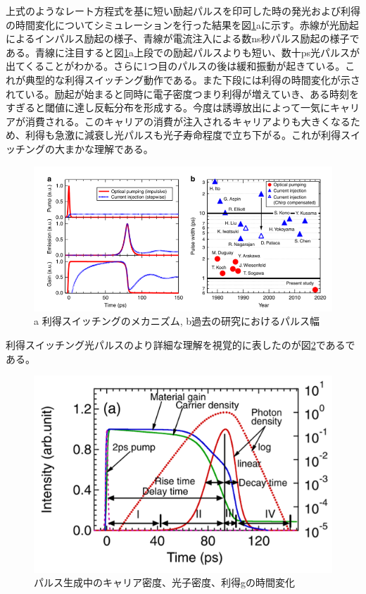上式のようなレート方程式を基に短い励起パルスを印可した時の発光および利得の時間変化についてシミュレーションを行った結果を図\ref{fig:fig_1_1_GS_ito}aに示す。赤線が光励起によるインパルス励起の様子、青線が電流注入による数ns秒パルス励起の様子である。青線に注目すると図\ref{fig:fig_1_1_GS_ito}a上段での励起パルスよりも短い、数十ps光パルスが出てくることがわかる。さらに1つ目のパルスの後は緩和振動が起きている。これが典型的な利得スイッチング動作である。また下段には利得の時間変化が示されている。励起が始まると同時に電子密度つまり利得が増えていき、ある時刻をすぎると閾値に達し反転分布を形成する。今度は誘導放出によって一気にキャリアが消費される。このキャリアの消費が注入されるキャリアよりも大きくなるため、利得も急激に減衰し光パルスも光子寿命程度で立ち下がる。これが利得スイッチングの大まかな理解である。

\begin{figure}[h]
	\centering
	\includegraphics[width=15cm]{figure/fig_1_1_GS_ito.png}
	\caption{a 利得スイッチングのメカニズム, b過去の研究におけるパルス幅\cite{ref_t_ito}}
	\label{fig:fig_1_1_GS_ito}
\end{figure}

\newpage
利得スイッチング光パルスのより詳細な理解を視覚的に表したのが図\ref{fig:fig_1_1_GS_pulse}である\cite{ref_1_1_GS}である。
\begin{figure}[h]
	\centering
	\includegraphics[width=15cm]{figure/fig_1_1_GS_pulse.png}
	\caption{パルス生成中のキャリア密度、光子密度、利得gの時間変化\cite{ref_1_1_GS}}
	\label{fig:fig_1_1_GS_pulse}
\end{figure}


